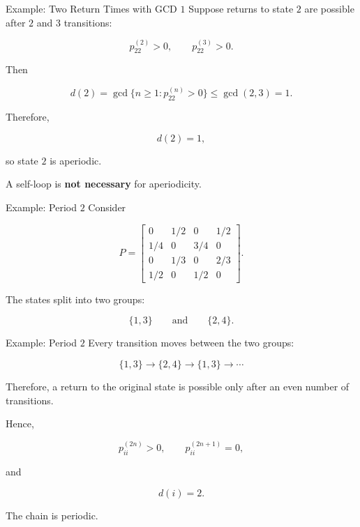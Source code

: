 \documentclass[
  ignorenonframetext,
  aspectratio=169,
]{beamer}
\begin{document}
\begin{frame}{Example: Two Return Times with GCD \(1\)}
\protect{}\label{example-two-return-times-with-gcd-1}
Suppose returns to state \(2\) are possible after \(2\) and \(3\)
transitions:

\[
p_{22}^{(2)}>0,
\qquad
p_{22}^{(3)}>0.
\]

Then

\[
d(2)
=
\gcd\{n\geq1:p_{22}^{(n)}>0\}
\leq
\gcd(2,3)=1.
\]

Therefore,

\[
\boxed{d(2)=1,}
\]

so state \(2\) is aperiodic.

A self-loop is \textbf{not necessary} for aperiodicity.
\end{frame}

\begin{frame}{Example: Period \(2\)}
\protect{}\label{example-period-2}
Consider

\[
P=
\begin{bmatrix}
0&1/2&0&1/2\\
1/4&0&3/4&0\\
0&1/3&0&2/3\\
1/2&0&1/2&0
\end{bmatrix}.
\]

The states split into two groups:

\[
\{1,3\}
\qquad\text{and}\qquad
\{2,4\}.
\]
\end{frame}

\begin{frame}{Example: Period \(2\)}
\protect{}\label{example-period-2-1}
Every transition moves between the two groups:

\[
\{1,3\}
\longrightarrow
\{2,4\}
\longrightarrow
\{1,3\}
\longrightarrow\cdots
\]

Therefore, a return to the original state is possible only after an even
number of transitions.

Hence,

\[
p_{ii}^{(2n)}>0,
\qquad
p_{ii}^{(2n+1)}=0,
\]

and

\[
\boxed{d(i)=2.}
\]

The chain is periodic.
\end{frame}
\end{document}
